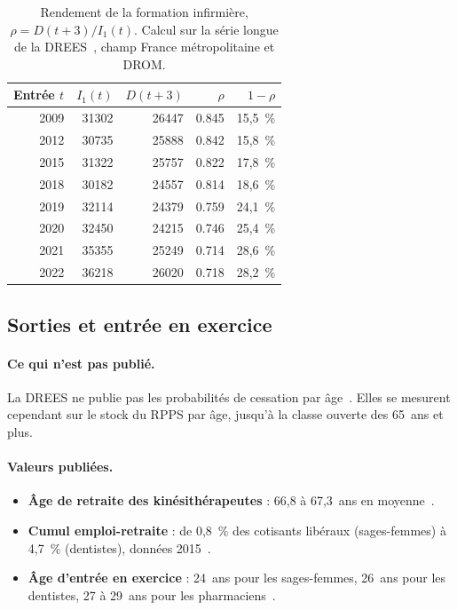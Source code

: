 \documentclass[11pt]{article}
\begin{document}
\begin{table}[htbp]
\centering\small
\caption{Rendement de la formation infirmière, $\rho = D(t+3)/I_1(t)$. Calcul\mesure{} sur la série longue de la DREES~\cite{drees491}, champ France métropolitaine et DROM.}\label{tab:rho}
\begin{tabular}{rrrrr}
\toprule
Entrée $t$ & $I_1(t)$ & $D(t+3)$ & $\rho$ & $1-\rho$ \\
\midrule
2009 & \num{31302} & \num{26447} & \num{0.845} & 15,5~\% \\
2012 & \num{30735} & \num{25888} & \num{0.842} & 15,8~\% \\
2015 & \num{31322} & \num{25757} & \num{0.822} & 17,8~\% \\
2018 & \num{30182} & \num{24557} & \num{0.814} & 18,6~\% \\
2019 & \num{32114} & \num{24379} & \num{0.759} & 24,1~\% \\
2020 & \num{32450} & \num{24215} & \num{0.746} & 25,4~\% \\
2021 & \num{35355} & \num{25249} & \num{0.714} & 28,6~\% \\
2022 & \num{36218} & \num{26020} & \num{0.718} & 28,2~\% \\
\bottomrule
\end{tabular}
\end{table}

\subsection{Sorties et entrée en exercice}

\paragraph{Ce qui n'est pas publié.}
La DREES ne publie pas les probabilités de cessation par âge~\cite{dd76}.
Elles se mesurent cependant sur le stock du RPPS par âge, jusqu'à la classe
ouverte des 65~ans et plus.

\paragraph{Valeurs publiées.}
\begin{itemize}
\item \textbf{Âge de retraite des kinésithérapeutes} : 66,8 à 67,3~ans en
  moyenne~\cite{cnomk2024}.
\item \textbf{Cumul emploi-retraite} : de 0,8~\%\derive{} des cotisants
  libéraux (sages-femmes) à 4,7~\%\derive{} (dentistes), données
  2015~\cite{cor2016}.
\item \textbf{Âge d'entrée en exercice} : 24~ans pour les sages-femmes,
  26~ans pour les dentistes, 27 à 29~ans pour les pharmaciens~\cite{dd76}.
\end{itemize}
\end{document}
